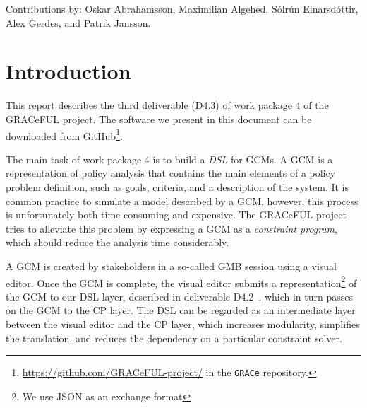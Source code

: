 \documentclass{article}
\newcommand{\grace}{GRACeFUL\xspace}
\begin{document}
Contributions by: Oskar Abrahamsson, Maximilian Algehed, Sólrún
Einarsdóttir, Alex Gerdes, and Patrik Jansson.

\begin{abstract}

This third deliverable (D4.3) of work package 4 presents the
translation of GRACeFUL concept maps (expressed as GRACe programs) to
the Constraint Functional Programming (CFP) layer.
%
This report builds on the description of GRACe in ``D4.2: A Domain
Specific Language (DSL) for GRACeFUL Concept Maps'' (delivered in
project month 24) and the third release of the CFP layer ``haskelzinc''.
%
(The first release was described in ``D5.1: Domain-Specific Language
for the Constraint Functional Programming Platform'' and the latest
version is available from the Haskell package repository
\href{https://hackage.haskell.org/package/haskelzinc}{Hackage}.)
%
The work leading up to this deliverable is within Task 4.3 ``implement
a middleware for connecting the DSL to the CFP layer'' and the full
source code of the implementation is available on GitHub.


\end{abstract}

\vfill

\setcounter{tocdepth}{2}
\tableofcontents

\vfill


\newpage

\section{Introduction}

This report describes the third deliverable (D4.3) of work package 4
of the \grace project. The software we present in this document can be
downloaded from
GitHub\footnote{\url{https://github.com/GRACeFUL-project/} in the
  \texttt{GRACe} repository.}.

The main task of work package 4 is to build a \emph{\ac{DSL}} for \acp{GCM}. A
\ac{GCM} is a representation of policy analysis that contains the main elements
of a policy problem definition, such as goals, criteria, and a description of
the system. It is common practice to simulate a model described by a \ac{GCM},
however, this process is unfortunately both time consuming and expensive. The
\grace project tries to alleviate this problem by expressing a \ac{GCM} as a
\emph{constraint program}, which should reduce the analysis time considerably.

A \ac{GCM} is created by stakeholders in a so-called \ac{GMB} session using a
visual editor. Once the \ac{GCM} is complete, the visual editor submits a
representation\footnote{We use \ac{JSON} as an exchange format} of the \ac{GCM}
to our \ac{DSL} layer, described in deliverable D4.2~\cite{D4.2}, which in turn
passes on the \ac{GCM} to the \ac{CP} layer. The \ac{DSL} can be regarded as an
intermediate layer between the visual editor and the \ac{CP} layer, which
increases modularity, simplifies the translation, and reduces the dependency on a
particular constraint solver.
\end{document}
